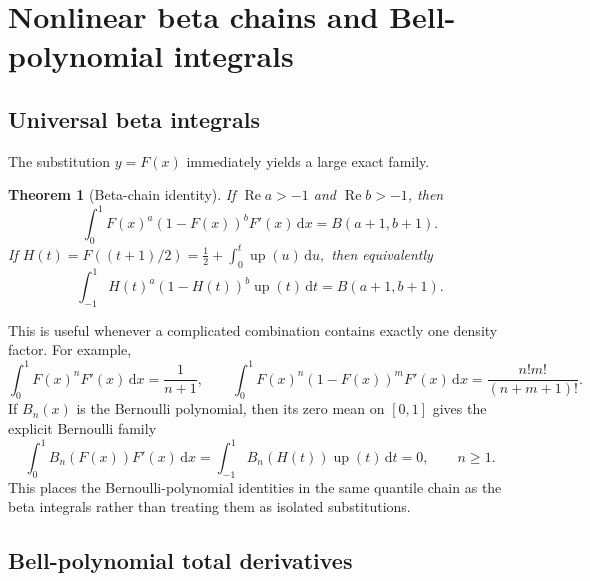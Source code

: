\documentclass[11pt]{article}
\newtheorem{theorem}{Theorem}[section]
\theoremstyle{definition}
\theoremstyle{remark}
\DeclareMathOperator{\upf}{up}
\DeclareMathOperator{\RePart}{Re}
\newcommand{\dd}{\,\mathrm d}
\begin{document}
\section{Nonlinear beta chains and Bell-polynomial integrals}

\subsection{Universal beta integrals}

The substitution \(y=F(x)\) immediately yields a large exact family.

\begin{theorem}[Beta-chain identity]
\label{thm:beta-chain}
If \(\RePart a>-1\) and \(\RePart b>-1\), then
\begin{equation}
 \boxed{
 \int_0^1F(x)^a(1-F(x))^bF'(x)\dd x
 =B(a+1,b+1).
 }                                                        \label{eq:beta-chain}
\end{equation}
If
\(
 H(t)=F((t+1)/2)=\frac12+\int_0^t\upf(u)\dd u,
\)
then equivalently
\begin{equation}
 \int_{-1}^1H(t)^a(1-H(t))^b\upf(t)\dd t=B(a+1,b+1).     \label{eq:beta-chain-up}
\end{equation}
\end{theorem}

This is useful whenever a complicated combination contains exactly one density factor.
For example,
\begin{equation}
 \int_0^1F(x)^nF'(x)\dd x=\frac1{n+1},\qquad
 \int_0^1F(x)^n(1-F(x))^mF'(x)\dd x
 =\frac{n!m!}{(n+m+1)!}.                                  \label{eq:beta-integers}
\end{equation}
If \(B_n(x)\) is the Bernoulli polynomial, then its zero mean on \([0,1]\) gives the
explicit Bernoulli family
\begin{equation}
 \int_0^1B_n(F(x))F'(x)\dd x
 =\int_{-1}^1B_n(H(t))\upf(t)\dd t=0,
 \qquad n\ge1.                                            \label{eq:Bernoulli-chain}
\end{equation}
This places the Bernoulli-polynomial identities in the same quantile chain as the beta
integrals rather than treating them as isolated substitutions.

\subsection{Bell-polynomial total derivatives}
\end{document}

